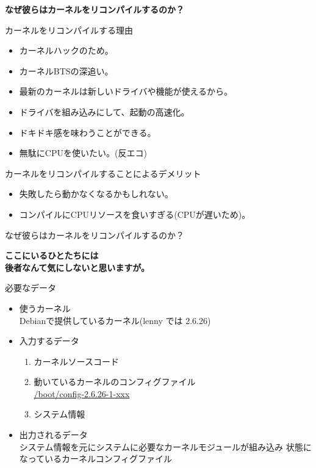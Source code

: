 \begin{frame}[containsverbatim]
\begin{center}
\large\bfseries
なぜ彼らはカーネルをリコンパイルするのか？
\end{center}
\end{frame}

\begin{frame}{カーネルをリコンパイルする理由}
\begin{itemize}
\item カーネルハックのため。
\item カーネルBTSの深追い。
\item 最新のカーネルは新しいドライバや機能が使えるから。
\item ドライバを組み込みにして、起動の高速化。
\item ドキドキ感を味わうことができる。
\item 無駄にCPUを使いたい。(反エコ)
\end{itemize}
\end{frame}

\begin{frame}{カーネルをリコンパイルすることによるデメリット}
\begin{itemize}
\item 失敗したら動かなくなるかもしれない。
\item コンパイルにCPUリソースを食いすぎる(CPUが遅いため)。
\end{itemize}
\end{frame}

\begin{frame}{なぜ彼らはカーネルをリコンパイルするのか？}
\begin{center}
\large\bfseries
ここにいるひとたちには\\
後者なんて気にしないと思いますが。
\end{center}
\end{frame}


\begin{frame}[containsverbatim]{必要なデータ}

\begin{itemize}
\item 使うカーネル\\
      Debianで提供しているカーネル(lenny では 2.6.26)
\item 入力するデータ
\begin{enumerate}
  \item カーネルソースコード
  \item 動いているカーネルのコンフィグファイル\\
	\url{/boot/config-2.6.26-1-xxx}
  \item システム情報
\end{enumerate}
\item 出力されるデータ\\
      システム情報を元にシステムに必要なカーネルモジュールが組み込み
      状態になっているカーネルコンフィグファイル
\end{itemize}
\end{frame}


